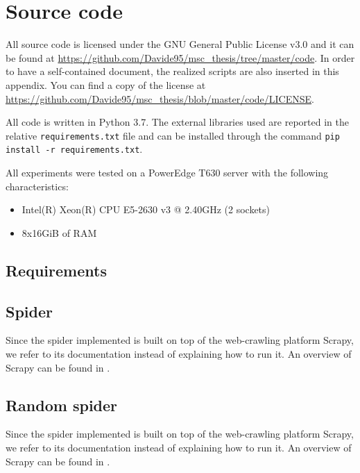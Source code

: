 \chapter{Source code}
All source code is licensed under the GNU General Public License v3.0 and it can be found at \url{https://github.com/Davide95/msc_thesis/tree/master/code}.
In order to have a self-contained document, the realized scripts are also inserted in this appendix.
You can find a copy of the license at \url{https://github.com/Davide95/msc_thesis/blob/master/code/LICENSE}.

All code is written in Python 3.7. The external libraries used are reported in the relative \texttt{requirements.txt} file and can be installed through the command \texttt{pip install -r requirements.txt}.

All experiments were tested on a PowerEdge T630 server with the following characteristics:
\begin{itemize}
    \item Intel(R) Xeon(R) CPU E5-2630 v3 @ 2.40GHz (2 sockets)
    \item 8x16GiB of RAM
\end{itemize}

\section{Requirements}
\begin{minipage}{\linewidth}
    
\end{minipage}

\pagebreak
\section{Spider} \label{spider}

Since the spider implemented is built on top of the web-crawling platform Scrapy, we refer to its documentation instead of explaining how to run it.
An overview of Scrapy can be found in \cite{kouzis2016learning}.



\pagebreak
\section{Random spider} \label{randomspider}

Since the spider implemented is built on top of the web-crawling platform Scrapy, we refer to its documentation instead of explaining how to run it.
An overview of Scrapy can be found in \cite{kouzis2016learning}.

